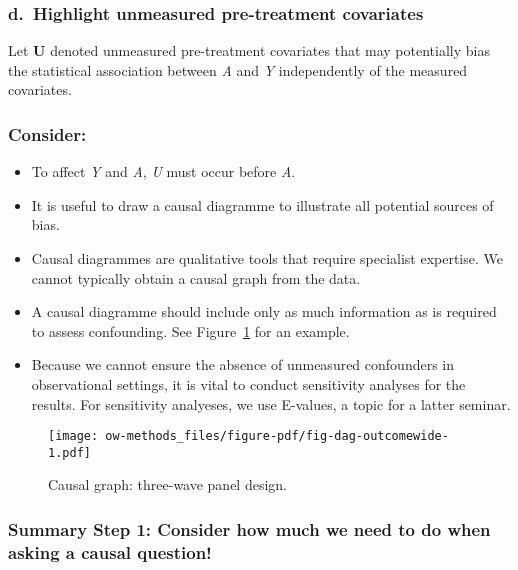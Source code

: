 \documentclass[
  singlecolumn]{article}
\providecommand{\tightlist}{%
  \setlength{\itemsep}{0pt}\setlength{\parskip}{0pt}}\usepackage{longtable,booktabs,array}
\begin{document}
\hypertarget{d.-highlight-unmeasured-pre-treatment-covariates}{%
\subsubsection{d.~Highlight unmeasured pre-treatment
covariates}\label{d.-highlight-unmeasured-pre-treatment-covariates}}

Let \textbf{U} denoted unmeasured pre-treatment covariates that may
potentially bias the statistical association between \emph{A} and
\emph{Y} independently of the measured covariates.

\hypertarget{consider}{%
\subsubsection{Consider:}\label{consider}}

\begin{itemize}
\tightlist
\item
  To affect \emph{Y} and \emph{A}, \emph{U} must occur before \emph{A}.
\item
  It is useful to draw a causal diagramme to illustrate all potential
  sources of bias.
\item
  Causal diagrammes are qualitative tools that require specialist
  expertise. We cannot typically obtain a causal graph from the data.
\item
  A causal diagramme should include only as much information as is
  required to assess confounding. See Figure~\ref{fig-dag-outcomewide}
  for an example.
\item
  Because we cannot ensure the absence of unmeasured confounders in
  observational settings, it is vital to conduct sensitivity analyses
  for the results. For sensitivity analyeses, we use E-values, a topic
  for a latter seminar.
\end{itemize}

\begin{figure}

{\centering \texttt{[image: ow-methods\_files/figure-pdf/fig-dag-outcomewide-1.pdf]}

}

\caption{\label{fig-dag-outcomewide}Causal graph: three-wave panel
design.}

\end{figure}

\hypertarget{summary-step-1-consider-how-much-we-need-to-do-when-asking-a-causal-question}{%
\subsubsection{Summary Step 1: Consider how much we need to do when
asking a causal
question!}\label{summary-step-1-consider-how-much-we-need-to-do-when-asking-a-causal-question}}
\end{document}
